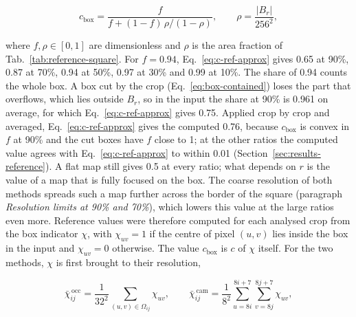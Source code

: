\begin{equation}
c_{\mathrm{box}} = \frac{f}{f + (1 - f)\,\rho / (1 - \rho)}, \qquad
\rho = \frac{|B_r|}{256^2},
\label{eq:c-ref-approx}
\end{equation}

where $f, \rho \in [0,1]$ are dimensionless and $\rho$ is the area fraction of
Tab.~\ref{tab:reference-square}. For $f = 0.94$, Eq.~\eqref{eq:c-ref-approx} gives
0.65 at 90\%, 0.87 at 70\%, 0.94 at 50\%, 0.97 at 30\% and 0.99 at 10\%. The share of 0.94
counts the whole box. A box cut by the crop (Eq.~\eqref{eq:box-contained}) loses the
part that overflows, which lies outside $B_r$, so in the input the share at 90\% is
0.961 on average, for which Eq.~\eqref{eq:c-ref-approx} gives 0.75. Applied crop by crop
and averaged, Eq.~\eqref{eq:c-ref-approx} gives the computed 0.76, because
$c_{\mathrm{box}}$ is convex in $f$ at 90\% and the cut boxes have $f$ close to 1; at
the other ratios the computed value agrees with Eq.~\eqref{eq:c-ref-approx} to within
0.01 (Section~\ref{sec:results-reference}). A flat map still gives 0.5 at every ratio; what depends on $r$ is the value of
a map that is fully focused on the box. The coarse resolution of both methods spreads
such a map further across the border of the square (paragraph \emph{Resolution limits
at 90\% and 70\%}), which lowers this value at the large ratios even more. Reference
values were therefore computed for each analysed crop from the box indicator $\chi$,
with $\chi_{uv} = 1$ if the centre of pixel $(u, v)$ lies inside the box in the input
and $\chi_{uv} = 0$ otherwise. The value $c_{\mathrm{box}}$ is $c$ of $\chi$ itself.
For the two methods, $\chi$ is first brought to their resolution,

\begin{equation}
\bar{\chi}^{\,\mathrm{occ}}_{ij} = \frac{1}{32^2} \sum_{(u,v) \in \Omega_{ij}}
\chi_{uv}, \qquad
\bar{\chi}^{\,\mathrm{cam}}_{ij} = \frac{1}{8^2} \sum_{u=8i}^{8i+7}
\sum_{v=8j}^{8j+7} \chi_{uv},
\label{eq:ref-grids}
\end{equation}

